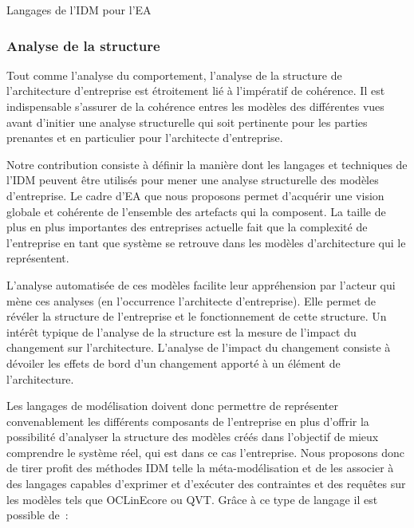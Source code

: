 \begin{table}[!ht]
    \begin{center}
        
    \end{center}
    \caption{Langages de l'IDM pour l'EA}
    \label{fig:IDM_EA}
\end{table}

\subsubsection{Analyse de la structure} Tout comme l'analyse du comportement,
l'analyse de la structure de l'architecture d'entreprise est étroitement lié à
l'impératif de cohérence. Il est indispensable s'assurer de la cohérence
entres les modèles des différentes vues avant d'initier une analyse
structurelle qui soit pertinente pour les parties prenantes et en particulier
pour l'architecte d'entreprise.

Notre contribution consiste à définir la manière dont les langages et techniques
de l'IDM peuvent être utilisés pour mener une analyse structurelle des modèles
d'entreprise. Le cadre d'EA que nous proposons permet d'acquérir une vision
globale et cohérente de l'ensemble des artefacts qui la composent. La taille de
plus en plus importantes des entreprises actuelle fait que la complexité de
l'entreprise en tant que système se retrouve dans les modèles d'architecture qui
le représentent.

L'analyse automatisée de ces modèles facilite leur appréhension par l'acteur qui
mène ces analyses (en l'occurrence l'architecte d'entreprise). Elle permet de
révéler la structure de l'entreprise et le fonctionnement de cette structure. Un
intérêt typique de l'analyse de la structure est la mesure de l'impact du
changement \cite{de2005change} sur l'architecture. L'analyse de l'impact du
changement consiste à dévoiler les effets de bord d'un changement apporté à un
élément de l'architecture.

Les langages de modélisation doivent donc permettre de représenter
convenablement les différents composants de l'entreprise en plus d'offrir la
possibilité d'analyser la structure des modèles créés dans l'objectif de mieux
comprendre le système réel, qui est dans ce cas l'entreprise. Nous proposons
donc de tirer profit des méthodes IDM telle la méta-modélisation et de les
associer à des langages capables d'exprimer et d'exécuter des contraintes et des
requêtes sur les modèles tels que OCLinEcore ou QVT. Grâce à ce type de langage
il est possible de~:

